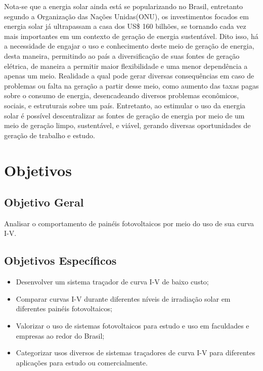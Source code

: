 \indent	Nota-se que a energia solar ainda está se popularizando no Brasil, entretanto segundo a Organização das Nações Unidas(ONU), os investimentos focados em energia solar já ultrapassam a casa dos US\$ 160 bilhões, se tornando cada vez mais importantes em um contexto de geração de energia sustentável. Dito isso, há a necessidade de engajar o uso e conhecimento deste meio de geração de energia, desta maneira, permitindo ao país a diversificação de suas fontes de geração elétrica, de maneira a permitir maior flexibilidade e uma menor dependência a apenas um meio.
Realidade a qual pode gerar diversas consequências em caso de problemas ou falta na geração a partir desse meio, como aumento das taxas pagas sobre o consumo de energia, desencadeando diversos problemas econômicos, sociais, e estruturais sobre um país. Entretanto, ao estimular o uso da energia solar é possível descentralizar as fontes de geração de energia por meio de um meio de geração limpo, sustentável, e viável, gerando diversas oportunidades de geração de trabalho e estudo.%


\section{Objetivos}

\subsection{Objetivo Geral}

Analisar o comportamento de painéis fotovoltaicos por meio do uso de sua curva I-V.

\subsection{Objetivos Específicos}
\begin{itemize}
	\item Desenvolver um sistema traçador de curva I-V de baixo custo;
	\item Comparar curvas I-V durante diferentes níveis de irradiação solar em diferentes painéis fotovoltaicos;
	\item Valorizar o uso de sistemas fotovoltaicos para estudo e uso em faculdades e empresas ao redor do Brasil;
	\item Categorizar usos diversos de sistemas traçadores de curva I-V para diferentes aplicações para estudo ou comercialmente.

\end{itemize}

